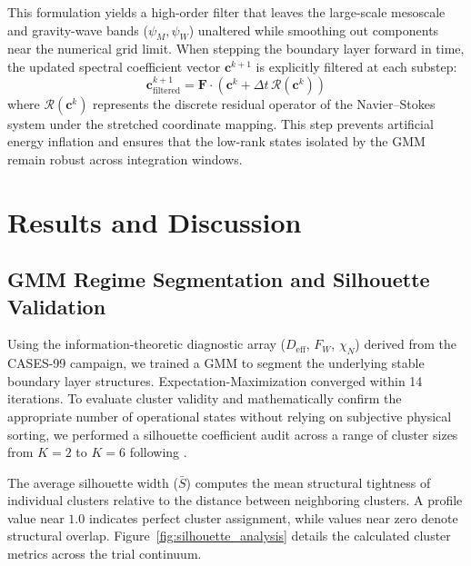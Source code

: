 This formulation yields a high-order filter that leaves the large-scale mesoscale and gravity-wave bands ($\psi_M, \psi_W$) unaltered while smoothing out components near the numerical grid limit. When stepping the boundary layer forward in time, the updated spectral coefficient vector $\mathbf{c}^{k+1}$ is explicitly filtered at each substep:
\begin{equation}
\mathbf{c}^{k+1}_{\mathrm{filtered}} = \mathbf{F} \cdot \left( \mathbf{c}^k + \Delta t \, \mathbf{\mathcal{R}}(\mathbf{c}^k) \right)
\label{eq:filtered_time_step}
\end{equation}
where $\mathbf{\mathcal{R}}(\mathbf{c}^k)$ represents the discrete residual operator of the Navier--Stokes system under the stretched coordinate mapping. This step prevents artificial energy inflation and ensures that the low-rank states isolated by the GMM remain robust across integration windows.

\section{Results and Discussion}
\label{sec:results}

\subsection{GMM Regime Segmentation and Silhouette Validation}
\label{sec:results:gmm}

Using the information-theoretic diagnostic array ($D_{\mathrm{eff}}$, $F_W$, $\chi_N$) derived from the CASES-99 campaign, we trained a GMM to segment the underlying stable boundary layer structures. Expectation-Maximization converged within 14 iterations. To evaluate cluster validity and mathematically confirm the appropriate number of operational states without relying on subjective physical sorting, we performed a silhouette coefficient audit across a range of cluster sizes from $K=2$ to $K=6$ following \citet{Rousseeuw1987}.

The average silhouette width ($\bar{S}$) computes the mean structural tightness of individual clusters relative to the distance between neighboring clusters. A profile value near $1.0$ indicates perfect cluster assignment, while values near zero denote structural overlap. Figure~\ref{fig:silhouette_analysis} details the calculated cluster metrics across the trial continuum.

